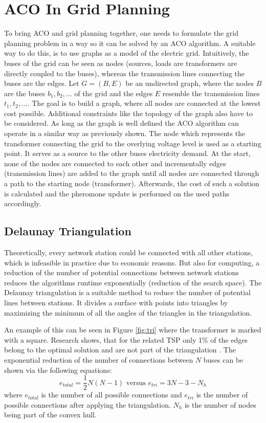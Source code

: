 \section{ACO In Grid Planning}

To bring ACO and grid planning together, one needs to formulate the grid planning problem in a way so it can be solved by an ACO algorithm. A suitable way to do this, is to use graphs as a model of the electric grid. Intuitively, the buses of the grid can be seen as nodes (sources, loads are transformers are directly coupled to the buses), whereas the transmission lines connecting the buses are the edges. Let $G = (B, E)$ be an undirected graph, where the nodes $B$ are the buses $b_1, b_2, ...$ of the grid and the edges $E$ resemble the transmission lines $t_1, t_2, ...$. The goal is to build a graph, where all nodes are connected at the lowest cost possible. Additional constraints like the topology of the graph also have to be considered. As long as the graph is well defined the ACO algorithm can operate in a similar way as previously shown.
The node which represents the transformer connecting the grid to the overlying voltage level is used as a starting point. It serves as a source to the other buses electricity demand. At the start, none of the nodes are connected to each other and incrementally edges (transmission lines) are added to the graph until all nodes are connected through a path to the starting node (transformer). Afterwards, the cost of such a solution is calculated and the pheromone update is performed on the used paths accordingly.

\subsection{Delaunay Triangulation}\label{triangulation}
Theoretically, every network station could be connected with all other stations, which is infeasible in practice due to economic reasons. But also for computing, a reduction of the number of potential connections between network stations reduces the algorithms runtime exponentially (reduction of the search space). The Delaunay triangulation is a suitable method to reduce the number of potential lines between stations. It divides a surface with points into triangles by maximizing the minimum of all the angles of the triangles in the triangulation.

An example of this can be seen in Figure \ref{fig:tri} where the transformer is marked with a square. Research shows, that for the related TSP only 1\% of the edges belong to the optimal solution and are not part of the triangulation \cite{schmitting2000traveling}. The exponential reduction of the number of connections between $N$ buses can be shown via the following equations:
$$e_{total} = \frac{1}{2}N(N-1)\text{ versus }e_{tri} = 3N - 3 - N_h$$
where $e_{total}$ is the number of all possible connections and $e_{tri}$ is the number of possible connections after applying the triangulation. $N_h$ is the number of nodes being part of the convex hull. \\

